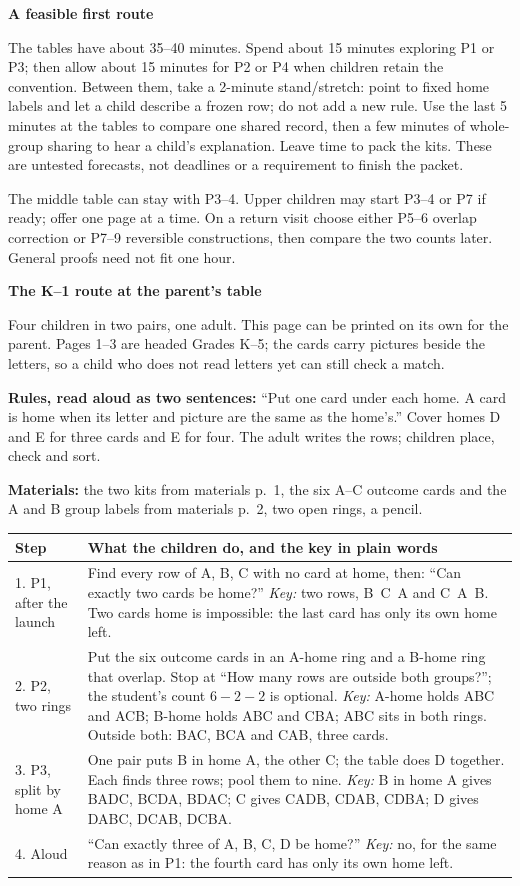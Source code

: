 \documentclass[11pt]{article}
\newcommand{\heading}[1]{\par\textbf{\large #1}\par}
\newcommand{\subhead}[1]{\par\textbf{#1}\par}
\newcommand{\guidepage}{\newpage}
\begin{document}
\subhead{A feasible first route}
The tables have about 35--40 minutes. Spend about 15 minutes exploring P1 or P3; then allow about 15 minutes for P2 or P4 when children retain the convention. Between them, take a 2-minute stand/stretch: point to fixed home labels and let a child describe a frozen row; do not add a new rule. Use the last 5 minutes at the tables to compare one shared record, then a few minutes of whole-group sharing to hear a child's explanation. Leave time to pack the kits. These are untested forecasts, not deadlines or a requirement to finish the packet.

The middle table can stay with P3--4. Upper children may start P3--4 or P7 if ready; offer one page at a time. On a return visit choose either P5--6 overlap correction or P7--9 reversible constructions, then compare the two counts later. General proofs need not fit one hour.



\guidepage
\heading{The K--1 route at the parent's table}
Four children in two pairs, one adult. This page can be printed on its own for the parent. Pages 1--3 are headed Grades K--5; the cards carry pictures beside the letters, so a child who does not read letters yet can still check a match.

\textbf{Rules, read aloud as two sentences:} ``Put one card under each home. A card is home when its letter and picture are the same as the home's.'' Cover homes D and E for three cards and E for four. The adult writes the rows; children place, check and sort.

\textbf{Materials:} the two kits from materials p.~1, the six A--C outcome cards and the A and B group labels from materials p.~2, two open rings, a pencil.

\begin{center}\begin{tabularx}{\linewidth}{@{}p{30mm}X@{}}\toprule
Step & What the children do, and the key in plain words\\\midrule
1. P1, after the launch & Find every row of A, B, C with no card at home, then: ``Can exactly two cards be home?'' \emph{Key:} two rows, B~C~A and C~A~B. Two cards home is impossible: the last card has only its own home left.\\
2. P2, two rings & Put the six outcome cards in an A-home ring and a B-home ring that overlap. Stop at ``How many rows are outside both groups?''; the student's count $6-2-2$ is optional. \emph{Key:} A-home holds ABC and ACB; B-home holds ABC and CBA; ABC sits in both rings. Outside both: BAC, BCA and CAB, three cards.\\
3. P3, split by home A & One pair puts B in home A, the other C; the table does D together. Each finds three rows; pool them to nine. \emph{Key:} B in home A gives BADC, BCDA, BDAC; C gives CADB, CDAB, CDBA; D gives DABC, DCAB, DCBA.\\
4. Aloud & ``Can exactly three of A, B, C, D be home?'' \emph{Key:} no, for the same reason as in P1: the fourth card has only its own home left.\\\bottomrule
\end{tabularx}\end{center}
\end{document}
